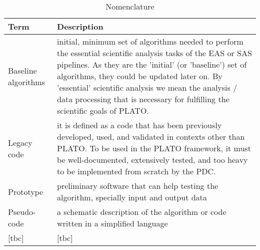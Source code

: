 \documentclass[a4paper, oneside, 11pt, article, english]{memoir}
\begin{document}
\begin{table}[htbp]
  \centering
  \caption{Nomenclature}
  \label{tab:nomenclature}
  \begin{tabular}{@{}lp{9cm}@{}}
    \toprule
    Term                & Description                                                                                                                                                                                                                                                                                                                                                     \\
    \midrule
    Baseline algorithms & initial, minimum set of algorithms needed to perform the essential scientific analysis tasks of the EAS or SAS pipelines. As they are the 'initial' (or 'baseline') set of algorithms, they could be updated later on. By 'essential' scientific analysis we mean the analysis / data processing that is necessary for fulfilling the scientific goals of PLATO.\\
    Legacy code         & it is defined as a code that has been previously developed, used, and validated in contexts other than PLATO. To be used in the PLATO framework, it must be well-documented, extensively tested, and too heavy to be implemented from scratch by the PDC.                                                                                                       \\
    Prototype           & preliminary software that can help testing the algorithm, specially input and output data                                                                                                                                                                                                                                                                       \\
    Pseudo-code         & a schematic description of the algorithm or code written in a simplified language                                                                                                                                                                                                                                                                               \\
    {[}tbc{]}           & {[}tbc{]}                                                                                                                                                                                                                                                                                                                                                       \\
    \bottomrule
  \end{tabular}
\end{table}
\end{document}
